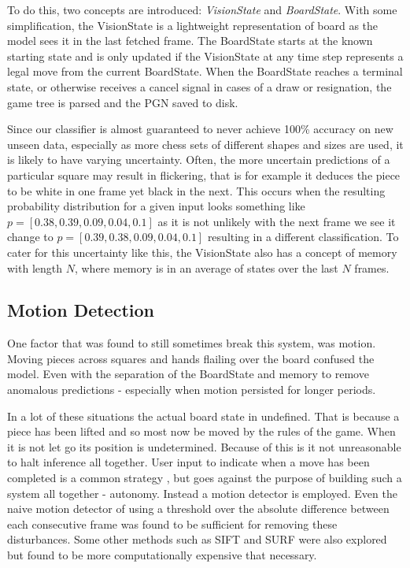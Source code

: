To do this, two concepts are introduced: \textit{VisionState} and \textit{BoardState}.  With some simplification, the VisionState is a lightweight 
representation of board as the model sees it in the last fetched frame.  The BoardState starts at the known starting state and is only updated if the VisionState at 
any time step represents a legal move from the current BoardState.  When the BoardState reaches a terminal state, or otherwise receives a cancel signal in cases of a 
draw or resignation, the game tree is parsed and the PGN saved to disk.

Since our classifier is almost guaranteed to never achieve 100\% accuracy on new unseen data, especially as more chess sets of different shapes and sizes are used, it 
is likely to have varying uncertainty.  Often, the more uncertain predictions of a particular square may result in flickering, that is for example it deduces the piece to 
be white in one frame yet black in the next.  This occurs when the resulting probability distribution for a given input looks something like 
$p = [0.38, 0.39, 0.09, 0.04, 0.1]$ as it is not unlikely with the next frame we see it change to $p = [0.39, 0.38, 0.09, 0.04, 0.1]$ resulting in a different classification.
To cater for this uncertainty like this, the VisionState also has a concept of memory with length $N$, where memory is in an average of states 
over the last $N$ frames.

\subsection{Motion Detection}
One factor that was found to still sometimes break this system, was motion.  Moving pieces across squares and hands flailing over the board confused the
model.  Even with the separation of the BoardState and memory to remove anomalous predictions - especially when motion persisted for longer periods.  

In a lot of these situations the actual board state in undefined.  That is because a piece has been lifted and so most now be moved by the rules of the game.
When it is not let go its position is undetermined.  Because of this is it not unreasonable to halt inference all together.  User input to indicate when a move
has been completed is a common strategy \cite{mannualcorners}, but goes against the purpose of building such a system all together - autonomy.  Instead a motion detector is 
employed.  Even the naive motion detector of using a threshold over the absolute difference between each consecutive frame was found to be sufficient for removing these
disturbances.  Some other methods such as SIFT and SURF were also explored but found to be more computationally expensive that necessary.

